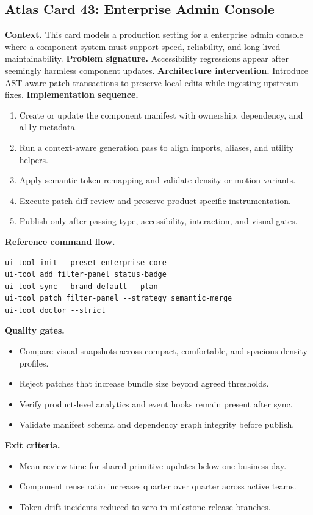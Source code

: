 \subsection*{Atlas Card 43: Enterprise Admin Console}
\textbf{Context.} This card models a production setting for a enterprise admin console where a component system must support speed, reliability, and long-lived maintainability.
\textbf{Problem signature.} Accessibility regressions appear after seemingly harmless component updates.
\textbf{Architecture intervention.} Introduce AST-aware patch transactions to preserve local edits while ingesting upstream fixes.
\textbf{Implementation sequence.}
\begin{enumerate}[leftmargin=*, itemsep=0.28em]
  \item Create or update the component manifest with ownership, dependency, and a11y metadata.
  \item Run a context-aware generation pass to align imports, aliases, and utility helpers.
  \item Apply semantic token remapping and validate density or motion variants.
  \item Execute patch diff review and preserve product-specific instrumentation.
  \item Publish only after passing type, accessibility, interaction, and visual gates.
\end{enumerate}
\textbf{Reference command flow.}
\begin{verbatim}
ui-tool init --preset enterprise-core
ui-tool add filter-panel status-badge
ui-tool sync --brand default --plan
ui-tool patch filter-panel --strategy semantic-merge
ui-tool doctor --strict
\end{verbatim}
\textbf{Quality gates.}
\begin{itemize}[leftmargin=*, itemsep=0.24em]
  \item Compare visual snapshots across compact, comfortable, and spacious density profiles.
  \item Reject patches that increase bundle size beyond agreed thresholds.
  \item Verify product-level analytics and event hooks remain present after sync.
  \item Validate manifest schema and dependency graph integrity before publish.
\end{itemize}
\textbf{Exit criteria.}
\begin{itemize}[leftmargin=*, itemsep=0.24em]
  \item Mean review time for shared primitive updates below one business day.
  \item Component reuse ratio increases quarter over quarter across active teams.
  \item Token-drift incidents reduced to zero in milestone release branches.
\end{itemize}
\clearpage
